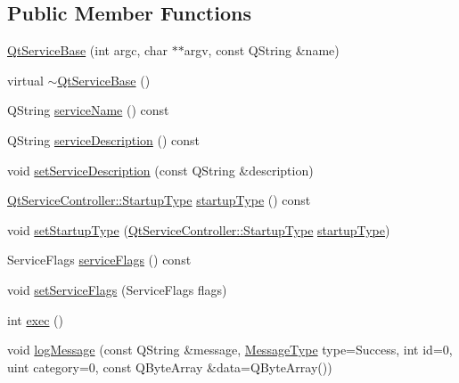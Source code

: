 \subsection*{Public Member Functions}
\begin{DoxyCompactItemize}
\item 
\mbox{\hyperlink{class_qt_service_base_a75e3f82739df6dc0b9aa899b3f9552eb}{Qt\+Service\+Base}} (int argc, char $\ast$$\ast$argv, const Q\+String \&name)
\item 
virtual \mbox{\hyperlink{class_qt_service_base_a82c0872e5ed2448eff9eb6521f75bfd2}{$\sim$\+Qt\+Service\+Base}} ()
\item 
Q\+String \mbox{\hyperlink{class_qt_service_base_a643f253b3931e6a6c4e8caa190756214}{service\+Name}} () const
\item 
Q\+String \mbox{\hyperlink{class_qt_service_base_a6cf3ef7bc5d85acb31e99a85fde47397}{service\+Description}} () const
\item 
void \mbox{\hyperlink{class_qt_service_base_a09d7547436c65a900f18c58b2a650286}{set\+Service\+Description}} (const Q\+String \&description)
\item 
\mbox{\hyperlink{class_qt_service_controller_a946ac2b079d9760503da923c2eaf0aac}{Qt\+Service\+Controller\+::\+Startup\+Type}} \mbox{\hyperlink{class_qt_service_base_aa1b3bf9b7fc09777b422f49f7bcfbcbe}{startup\+Type}} () const
\item 
void \mbox{\hyperlink{class_qt_service_base_a6beddd54c973c3a7d81075b2f3f80df2}{set\+Startup\+Type}} (\mbox{\hyperlink{class_qt_service_controller_a946ac2b079d9760503da923c2eaf0aac}{Qt\+Service\+Controller\+::\+Startup\+Type}} \mbox{\hyperlink{class_qt_service_base_aa1b3bf9b7fc09777b422f49f7bcfbcbe}{startup\+Type}})
\item 
Service\+Flags \mbox{\hyperlink{class_qt_service_base_aab0b204981c481e098fe72061e3f367a}{service\+Flags}} () const
\item 
void \mbox{\hyperlink{class_qt_service_base_a3f8a07d0cf536720e7fcf1ec562635d1}{set\+Service\+Flags}} (Service\+Flags flags)
\item 
int \mbox{\hyperlink{class_qt_service_base_afae2e589de71c1ae3ae8db3dc9ab9c64}{exec}} ()
\item 
void \mbox{\hyperlink{class_qt_service_base_ac071ce0b30547e17c3b3ca9dcb0108c9}{log\+Message}} (const Q\+String \&message, \mbox{\hyperlink{class_qt_service_base_acffd9389fe7178bf1f35d8bf3dae1095}{Message\+Type}} type=Success, int id=0, uint category=0, const Q\+Byte\+Array \&data=Q\+Byte\+Array())
\end{DoxyCompactItemize}
